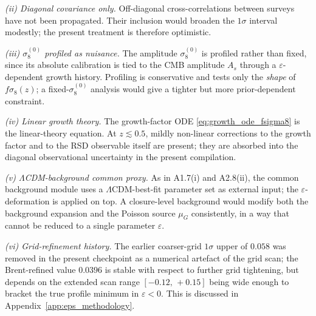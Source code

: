 \textit{(ii) Diagonal covariance only.}
Off-diagonal cross-correlations between surveys have not been
propagated. Their inclusion would broaden the $1\sigma$ interval
modestly; the present treatment is therefore optimistic.

\textit{(iii) $\sigma_8^{(0)}$ profiled as nuisance.}
The amplitude $\sigma_8^{(0)}$ is profiled rather than fixed,
since its absolute calibration is tied to the CMB amplitude $A_s$
through a $\varepsilon$-dependent growth history. Profiling is
conservative and tests only the \emph{shape} of $f\sigma_8(z)$;
a fixed-$\sigma_8^{(0)}$ analysis would give a tighter but more
prior-dependent constraint.

\textit{(iv) Linear growth theory.}
The growth-factor ODE \eqref{eq:growth_ode_fsigma8} is the
linear-theory equation. At $z \lesssim 0.5$, mildly non-linear
corrections to the growth factor and to the RSD observable
itself are present; they are absorbed into the diagonal observational
uncertainty in the present compilation.

\textit{(v) $\Lambda$CDM-background common proxy.}
As in A1.7(i) and A2.8(ii), the common background module uses a
$\Lambda$CDM-best-fit parameter set as external input; the
$\varepsilon$-deformation is applied on top. A closure-level
background would modify both the background expansion and the
Poisson source $\mu_G$ consistently, in a way that cannot be
reduced to a single parameter $\varepsilon$.

\textit{(vi) Grid-refinement history.}
The earlier coarser-grid $1\sigma$ upper of $0.058$ was removed in
the present checkpoint as a numerical artefact of the grid scan;
the Brent-refined value $0.0396$ is stable with respect to further
grid tightening, but depends on the extended scan range
$[-0.12,\,+0.15]$ being wide enough to bracket the true profile
minimum in $\varepsilon < 0$. This is discussed in
Appendix~\ref{app:eps_methodology}.

